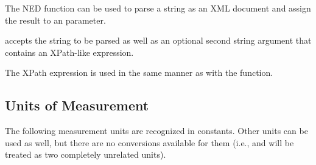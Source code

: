 The  NED function can be used to parse a string as an
XML document and assign the result to an  parameter.

 accepts the string to be parsed as well as an optional
second string argument that contains an XPath-like expression.

The XPath expression is used in the same manner as with the
 function.


\subsection{Units of Measurement}
\label{sec:ned-ref:units}

The following measurement units are recognized in constants. Other units can be
used as well, but there are no conversions available for them (i.e.,
 and  will be treated as two completely unrelated
units).

